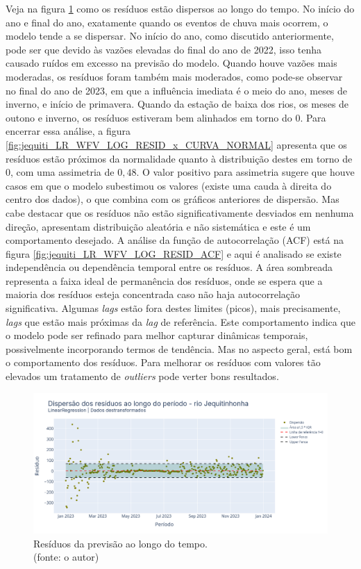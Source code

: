 Veja na figura \ref{fig:jequiti_LR_WFV_LOG_RESID_x_TEMPO} como os resíduos estão dispersos ao longo do tempo. No início do ano e final do ano, exatamente quando os eventos de chuva mais ocorrem, o modelo tende a se dispersar. No início do ano, como discutido anteriormente, pode ser que devido às vazões elevadas do final do ano de 2022, isso tenha causado ruídos em excesso na previsão do modelo. Quando houve vazões mais moderadas, os resíduos foram também mais moderados, como pode-se observar no final do ano de 2023, em que a influência imediata é o meio do ano, meses de inverno, e início de primavera. Quando da estação de baixa dos rios, os meses de outono e inverno, os resíduos estiveram bem alinhados em torno do $0$. Para encerrar essa análise, a figura \ref{fig:jequiti_LR_WFV_LOG_RESID_x_CURVA_NORMAL} apresenta que os resíduos estão próximos da normalidade quanto à distribuição destes em torno de $0$, com uma assimetria de $0,48$. O valor positivo para assimetria sugere que houve casos em que o modelo subestimou os valores (existe uma cauda à direita do centro dos dados), o que combina com os gráficos anteriores de dispersão. Mas cabe destacar que os resíduos não estão significativamente desviados em nenhuma direção, apresentam distribuição aleatória e não sistemática e este é um comportamento desejado. A análise da função de autocorrelação (ACF) está na figura \ref{fig:jequiti_LR_WFV_LOG_RESID_ACF} e aqui é analisado se existe independência ou dependência temporal entre os resíduos. A área sombreada representa a faixa ideal de permanência dos resíduos, onde se espera que a maioria dos resíduos esteja concentrada caso não haja autocorrelação significativa. Algumas \textit{lags} estão fora destes limites (picos), mais precisamente, \textit{lags} que estão mais próximas da \textit{lag} de referência. Este comportamento indica que o modelo pode ser refinado para melhor capturar dinâmicas temporais, possivelmente incorporando termos de tendência. Mas no aspecto geral, está bom o comportamento dos resíduos. Para melhorar os resíduos com valores tão elevados um tratamento de \textit{outliers} pode verter bons resultados.

\begin{figure}[!h]
	\centering
	\includegraphics[scale=0.33]{Figuras/jequiti/resultados/LR_WFV_LOG_RESID_x_TEMPO.png}
	\caption{Resíduos da previsão ao longo do tempo.\\(fonte: o autor)}
	\label{fig:jequiti_LR_WFV_LOG_RESID_x_TEMPO}
\end{figure}

